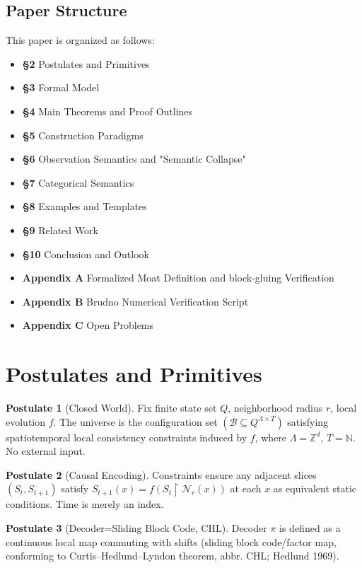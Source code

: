 \documentclass[12pt]{article}
\theoremstyle{plain}
\theoremstyle{definition}
\newtheorem{postulate}{Postulate}
\begin{document}
\subsection{Paper Structure}

This paper is organized as follows:

\begin{itemize}
\item \textbf{\S 2} Postulates and Primitives
\item \textbf{\S 3} Formal Model
\item \textbf{\S 4} Main Theorems and Proof Outlines
\item \textbf{\S 5} Construction Paradigms
\item \textbf{\S 6} Observation Semantics and "Semantic Collapse"
\item \textbf{\S 7} Categorical Semantics
\item \textbf{\S 8} Examples and Templates
\item \textbf{\S 9} Related Work
\item \textbf{\S 10} Conclusion and Outlook
\item \textbf{Appendix A} Formalized Moat Definition and block-gluing Verification
\item \textbf{Appendix B} Brudno Numerical Verification Script
\item \textbf{Appendix C} Open Problems
\end{itemize}

\section{Postulates and Primitives}

\begin{postulate}[Closed World]
Fix finite state set $Q$, neighborhood radius $r$, local evolution $f$. The universe is the configuration set $(\mathcal{B} \subseteq Q^{\Lambda \times T})$ satisfying spatiotemporal local consistency constraints induced by $f$, where $\Lambda = \mathbb{Z}^d$, $T = \mathbb{N}$. No external input.
\end{postulate}

\begin{postulate}[Causal Encoding]
Constraints ensure any adjacent slices $(S_t, S_{t+1})$ satisfy $S_{t+1}(x) = f(S_t \upharpoonright \mathcal{N}_r(x))$ at each $x$ as equivalent static conditions. Time is merely an index.
\end{postulate}

\begin{postulate}[Decoder=Sliding Block Code, CHL]
Decoder $\pi$ is defined as a continuous local map commuting with shifts (sliding block code/factor map, conforming to Curtis--Hedlund--Lyndon theorem, abbr. CHL; Hedlund 1969\cite{hedlund1969}).
\end{postulate}
\end{document}
